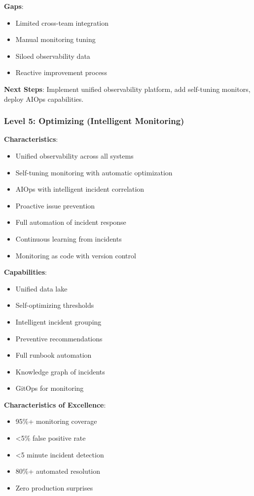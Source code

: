 \textbf{Gaps}:
\begin{itemize}
    \item Limited cross-team integration
    \item Manual monitoring tuning
    \item Siloed observability data
    \item Reactive improvement process
\end{itemize}

\textbf{Next Steps}: Implement unified observability platform, add self-tuning monitors, deploy AIOps capabilities.

\subsubsection{Level 5: Optimizing (Intelligent Monitoring)}

\textbf{Characteristics}:
\begin{itemize}
    \item Unified observability across all systems
    \item Self-tuning monitoring with automatic optimization
    \item AIOps with intelligent incident correlation
    \item Proactive issue prevention
    \item Full automation of incident response
    \item Continuous learning from incidents
    \item Monitoring as code with version control
\end{itemize}

\textbf{Capabilities}:
\begin{itemize}
    \item Unified data lake
    \item Self-optimizing thresholds
    \item Intelligent incident grouping
    \item Preventive recommendations
    \item Full runbook automation
    \item Knowledge graph of incidents
    \item GitOps for monitoring
\end{itemize}

\textbf{Characteristics of Excellence}:
\begin{itemize}
    \item 95\%+ monitoring coverage
    \item <5\% false positive rate
    \item <5 minute incident detection
    \item 80\%+ automated resolution
    \item Zero production surprises
\end{itemize}

